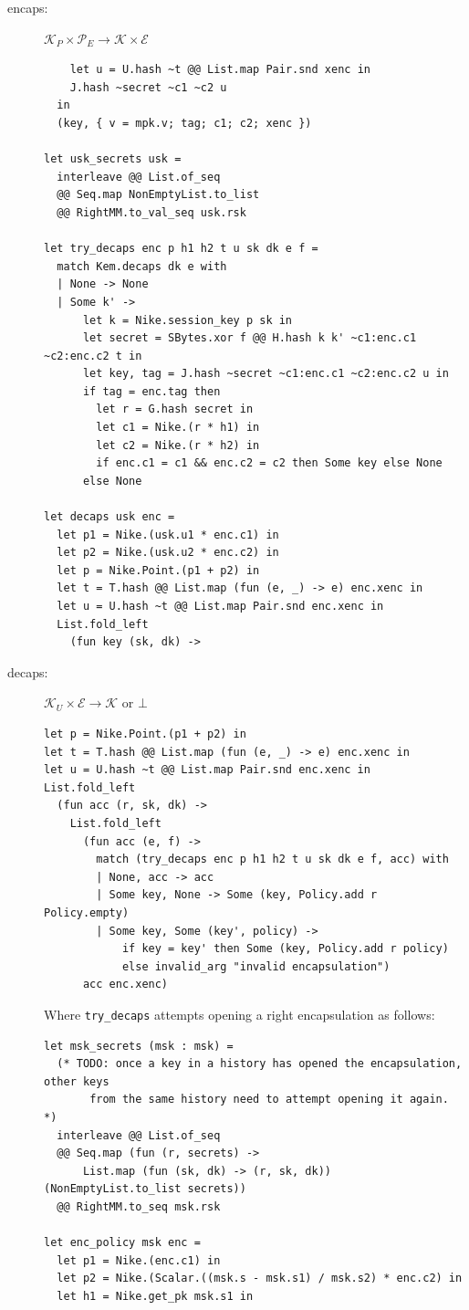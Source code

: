 \documentclass[a4paper]{article}
\theoremstyle{definition}
\newcommand{\cE}{\mathcal{E}}
\newcommand{\cK}{\mathcal{K}}
\newcommand{\cP}{\mathcal{P}}
\begin{document}
\begin{description}
\item[{encaps:}] \(\cK_P \times \cP_E \rightarrow \cK \times \cE\)

\begin{verbatim}
    let u = U.hash ~t @@ List.map Pair.snd xenc in
    J.hash ~secret ~c1 ~c2 u
  in
  (key, { v = mpk.v; tag; c1; c2; xenc })

let usk_secrets usk =
  interleave @@ List.of_seq
  @@ Seq.map NonEmptyList.to_list
  @@ RightMM.to_val_seq usk.rsk

let try_decaps enc p h1 h2 t u sk dk e f =
  match Kem.decaps dk e with
  | None -> None
  | Some k' ->
      let k = Nike.session_key p sk in
      let secret = SBytes.xor f @@ H.hash k k' ~c1:enc.c1 ~c2:enc.c2 t in
      let key, tag = J.hash ~secret ~c1:enc.c1 ~c2:enc.c2 u in
      if tag = enc.tag then
        let r = G.hash secret in
        let c1 = Nike.(r * h1) in
        let c2 = Nike.(r * h2) in
        if enc.c1 = c1 && enc.c2 = c2 then Some key else None
      else None

let decaps usk enc =
  let p1 = Nike.(usk.u1 * enc.c1) in
  let p2 = Nike.(usk.u2 * enc.c2) in
  let p = Nike.Point.(p1 + p2) in
  let t = T.hash @@ List.map (fun (e, _) -> e) enc.xenc in
  let u = U.hash ~t @@ List.map Pair.snd enc.xenc in
  List.fold_left
    (fun key (sk, dk) ->
\end{verbatim}

\item[{decaps:}] \(\cK_U \times \cE \rightarrow \cK\) or \(\bot\)

\begin{verbatim}
let p = Nike.Point.(p1 + p2) in
let t = T.hash @@ List.map (fun (e, _) -> e) enc.xenc in
let u = U.hash ~t @@ List.map Pair.snd enc.xenc in
List.fold_left
  (fun acc (r, sk, dk) ->
    List.fold_left
      (fun acc (e, f) ->
        match (try_decaps enc p h1 h2 t u sk dk e f, acc) with
        | None, acc -> acc
        | Some key, None -> Some (key, Policy.add r Policy.empty)
        | Some key, Some (key', policy) ->
            if key = key' then Some (key, Policy.add r policy)
            else invalid_arg "invalid encapsulation")
      acc enc.xenc)
\end{verbatim}

Where \texttt{try\_decaps} attempts opening a right encapsulation as follows:

\begin{verbatim}
let msk_secrets (msk : msk) =
  (* TODO: once a key in a history has opened the encapsulation, other keys
       from the same history need to attempt opening it again. *)
  interleave @@ List.of_seq
  @@ Seq.map (fun (r, secrets) ->
      List.map (fun (sk, dk) -> (r, sk, dk)) (NonEmptyList.to_list secrets))
  @@ RightMM.to_seq msk.rsk

let enc_policy msk enc =
  let p1 = Nike.(enc.c1) in
  let p2 = Nike.(Scalar.((msk.s - msk.s1) / msk.s2) * enc.c2) in
  let h1 = Nike.get_pk msk.s1 in
\end{verbatim}
\end{description}
\end{document}
